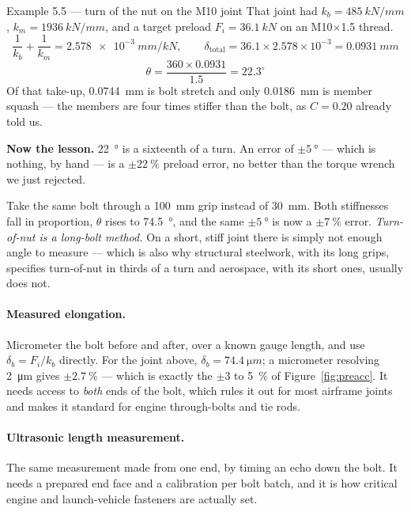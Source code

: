 \documentclass[11pt,a4paper]{article}
\begin{document}
\begin{examplebox}{Example 5.5 --- turn of the nut on the M10 joint}
That joint had $k_b=\SI{485}{kN/mm}$, $k_m=\SI{1936}{kN/mm}$, and a target preload
$F_i=\SI{36.1}{kN}$ on an M10$\times$1.5 thread.
\[
\frac{1}{k_b}+\frac{1}{k_m}=\SI{2.578e-3}{mm/kN},\qquad
\delta_{\text{total}} = 36.1\times2.578\times10^{-3} = \SI{0.0931}{mm}
\]
\[
\theta = \frac{360\times0.0931}{1.5} = \mathbf{22.3^\circ}
\]
Of that take-up, \SI{0.0744}{mm} is bolt stretch and only \SI{0.0186}{mm} is member squash --- the
members are four times stiffer than the bolt, as $C=0.20$ already told us.

\medskip
\textbf{Now the lesson.} \SI{22}{\degree} is a sixteenth of a turn. An error of
$\pm\SI{5}{\degree}$ --- which is nothing, by hand --- is a $\pm\SI{22}{\percent}$ preload error,
no better than the torque wrench we just rejected.

\medskip
Take the same bolt through a \SI{100}{mm} grip instead of \SI{30}{mm}. Both stiffnesses fall in
proportion, $\theta$ rises to \SI{74.5}{\degree}, and the same $\pm\SI{5}{\degree}$ is now a
$\pm\SI{7}{\percent}$ error. \emph{Turn-of-nut is a long-bolt method.} On a short, stiff joint there
is simply not enough angle to measure --- which is also why structural steelwork, with its long
grips, specifies turn-of-nut in thirds of a turn and aerospace, with its short ones, usually does
not.
\end{examplebox}

\paragraph{Measured elongation.} Micrometer the bolt before and after, over a known gauge length,
and use $\delta_b = F_i/k_b$ directly. For the joint above, $\delta_b = \SI{74.4}{\micro m}$; a
micrometer resolving \SI{2}{\micro m} gives $\pm\SI{2.7}{\percent}$ --- which is exactly the
$\pm3$ to \SI{5}{\percent} of Figure~\ref{fig:preacc}. It needs access to \emph{both} ends of the
bolt, which rules it out for most airframe joints and makes it standard for engine through-bolts and
tie rods.

\paragraph{Ultrasonic length measurement.} The same measurement made from one end, by timing an
echo down the bolt. It needs a prepared end face and a calibration per bolt batch, and it is how
critical engine and launch-vehicle fasteners are actually set.
\end{document}
